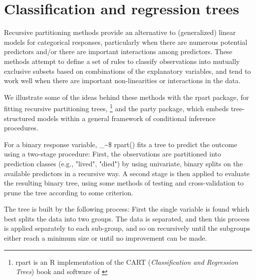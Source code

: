 \documentclass{article}
\makeatletter
\newcommand\code{\bgroup\@makeother\_\@makeother\~\@makeother\$\@codex}
\def\@codex#1{{\normalfont\ttfamily\hyphenchar\font=-1 #1}\egroup}
\newcommand{\func}[1]{\code{#1()}}
\let\proglang=\textsf
\newcommand{\R}{\proglang{R}\xspace}
\newcommand{\pkg}[1]{\textsf{#1}\nocite{R-#1}}
\newcommand{\Rpackage}[1]{\pkg{#1} package}
\makeatother
\begin{document}






\section*{Classification and regression trees}

Recursive partitioning methods provide an alternative to (generalized) linear
models for categorical responses, particularly when there are numerous
potential predictors and/or there are important interactions among predictors.
These methods attempt to define a set of rules to classify observations into
mutually exclusive subsets based on combinations of the explanatory variables,
and tend to work well when there are important non-linearities or interactions
in the data.  

We illustrate some of the ideas behind these methods with
the \Rpackage{rpart}, for fitting recursive partitioning trees,%
\footnote{\pkg{rpart} is an \R implementation of the CART
(\emph{Classification and Regression Trees})
book and software of \citet{Breiman-etal:1984}}
and the
\Rpackage{party}, which embeds tree-structured models within a general
framework of conditional inference procedures.  

For a binary response variable, \func{rpart} fits a tree to predict the
outcome using a two-stage procedure:  First, the observations are partitioned
into prediction classes (e.g., "lived", "died") by using univariate, binary splits
on the available predictors in a recursive way.  
A second stage is then applied to evaluate the resulting binary tree, using some
methods of testing and cross-validation to prune the tree according to some
criterion.

The tree is built by the following process: First the single variable is found which best
splits the data into two groups. The data is separated, and
then this process is applied separately to each sub-group, and so on recursively until the
subgroups either reach a minimum size or until no improvement can be
made.
\end{document}
